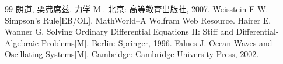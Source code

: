 \documentclass[UTF8,12pt,a4paper]{ctexart}
\begin{document}
\newpage
\begin{thebibliography}{99}
朗道, 栗弗席兹. 力学[M]. 北京: 高等教育出版社, 2007.
Weisstein E W. Simpson's Rule[EB/OL]. MathWorld--A Wolfram Web Resource.
\RaggedRight %
Hairer E, Wanner G. Solving Ordinary Differential Equations  II: Stiff and Differential-Algebraic Problems[M]. Berlin: Springer, 1996.
Falnes J. Ocean Waves and Oscillating Systems[M]. Cambridge: Cambridge University Press, 2002.
\end{thebibliography}

\newpage
\appendix

\end{document}
